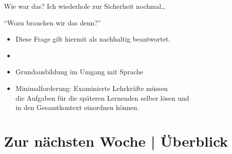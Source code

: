 \begin{frame}
  {Wie war das?}
  Ich wiederhole zur Sicherheit nochmal\ldots\\
  \Zeile
  \onslide<+->
  \begin{center}
    \Large{}
  \end{center}
\end{frame}

\begin{frame}
  {"`Wozu brauchen wir das denn?"'}
  \onslide<+->
  \begin{itemize}[<+->]
    \item Diese Frage gilt hiermit als nachhaltig beantwortet.
      \Zeile
    \item {}
    \item Grundausbildung im \alert{Umgang mit Sprache} 
      \Zeile
    \item Minimalforderung: \alert{Examinierte Lehrkräfte müssen\\
      die Aufgaben für die späteren Lernenden selber lösen und\\
      in den Gesamtkontext einordnen können.}
  \end{itemize}
\end{frame}

\section{Zur nächsten Woche | Überblick}

